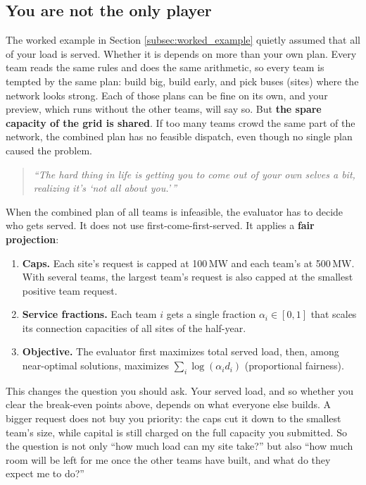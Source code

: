 \documentclass[10pt]{article}
\newcommand{\MW}{\ensuremath{\,\mathrm{MW}}}
\begin{document}
\subsection{You are not the only player}\label{sec:projection}
The worked example in Section \ref{subsec:worked_example} quietly assumed that all of your load is served. Whether it
is depends on more than your own plan. Every team reads the same rules and does
the same arithmetic, so every team is tempted by the same plan: build big,
build early, and pick buses (sites) where the network looks strong. Each of those plans
can be fine on its own, and your preview, which runs without the other teams,
will say so. But \textbf{the spare capacity of the grid is shared}. If too many teams
crowd the same part of the network, the combined plan has no feasible dispatch,
even though no single plan caused the problem.

\begin{quote}
\itshape ``The hard thing in life is getting you to come out of your own selves
a bit, realizing it's `not all about you.'\,''
\end{quote}

When the combined plan of all teams is infeasible, the evaluator has to decide who gets
served. It does not use first-come-first-served. It applies a \textbf{fair
projection}:
\begin{enumerate}[leftmargin=*]
  \item \textbf{Caps.} Each site's request is capped at 100\MW{} and each team's
    at 500\MW{}. With several teams, the largest team's request is also capped
    at the smallest positive team request.
  \item \textbf{Service fractions.} Each team $i$ gets a single fraction
    $\alpha_i \in [0,1]$ that scales its connection capacities of all sites of the half-year.
  \item \textbf{Objective.} The evaluator first maximizes total served load,
    then, among near-optimal solutions, maximizes $\sum_i \log(\alpha_i d_i)$
    (proportional fairness).
\end{enumerate}

This changes the question you should ask. Your served load, and so
whether you clear the break-even points above, depends on what everyone else
builds. A bigger request does not buy you priority: the caps cut
it down to the smallest team's size, while capital is still charged on the full
capacity you submitted. So the question is not only ``how much load can my
site take?'' but also ``how much room will be left for me once the other teams
have built, and what do they expect me to do?''
\end{document}
